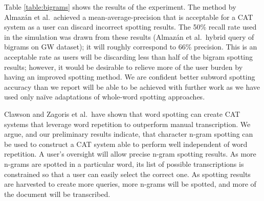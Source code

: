 \documentclass[conference]{IEEEtran}
\begin{document}
Table \ref{table:bigrams} shows the results of the experiment. The method by Almaz\'{a}n et al.~achieved a mean-average-precision that is acceptable for a CAT system as a user can discard incorrect spotting results.
The 50\% recall rate used in the simulation was drawn from these results (Almaz\'{a}n et al.~hybrid query of bigrams on GW dataset); it will roughly correspond to 66\% precision. This is an acceptable rate as users will be discarding less than half of the bigram spotting results; however, it would be desirable to relieve more of the user burden by having an improved spotting method.
We are confident better subword spotting accuracy than we report will be able to be achieved with further work as we have used only na\"{i}ve adaptations of whole-word spotting approaches.

Clawson and Zagoris et al.~have shown that word spotting can create CAT systems that leverage word repetition to outperform manual transcription. We argue, and our preliminary results indicate, that character n-gram spotting can be used to construct a CAT system able to perform well independent of word repetition. A user's oversight will allow precise n-gram spotting results. As more n-grams are spotted in a particular word, its list of possible transcriptions is constrained so that a user can easily select the correct one. As spotting results are harvested to create more queries, more n-grams will be spotted, and more of the document will be transcribed.





\end{document}
